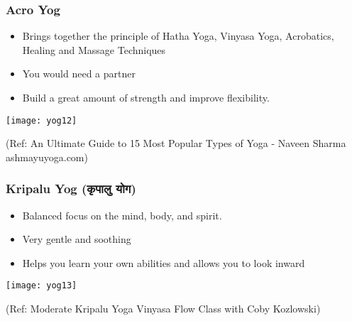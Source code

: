 \begin{frame}[fragile]\frametitle{Acro Yog}
	\begin{itemize}
	\item Brings together the principle of Hatha Yoga, Vinyasa Yoga, Acrobatics, Healing and Massage Techniques
	\item You would need a partner 
	\item Build a great amount of strength and improve flexibility.
	\end{itemize}

\begin{center}
\texttt{[image: yog12]}

\tiny{(Ref: An Ultimate Guide to 15 Most Popular Types of Yoga - Naveen Sharma ashmayuyoga.com)}
\end{center}
\end{frame}

\begin{frame}[fragile]\frametitle{Kripalu Yog (कृपालु योग)}
	\begin{itemize}
	\item Balanced focus on the mind, body, and spirit.
	\item Very gentle and soothing
	\item Helps you learn your own abilities and allows you to look inward
	\end{itemize}

\begin{center}
\texttt{[image: yog13]}

\tiny{(Ref: Moderate Kripalu Yoga Vinyasa Flow Class with Coby Kozlowski)}
\end{center}

\end{frame}
